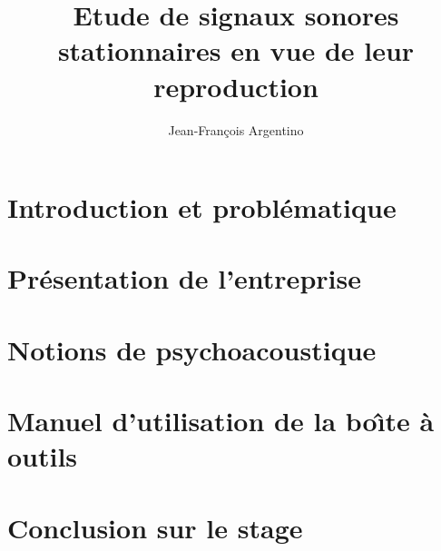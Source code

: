 \documentclass[12pt,a4paper,french]{report}
\title{Etude de signaux sonores stationnaires en vue de leur reproduction}
\author{Jean-Fran\c{c}ois Argentino}
\renewcommand \( { \left( }
\renewcommand \) { \right) }
\renewcommand \[ { \left[ }
\renewcommand \] { \right] }
\begin{document}
\sloppy

\maketitle
\newpage

\tableofcontents
\newpage

\listoffigures
\newpage

\chapter*{Introduction et probl{\'e}matique}


\chapter{Pr{\'e}sentation de l'entreprise}
\label{genesis}


\chapter{Notions de psychoacoustique}
\label{theorie}


\chapter{Manuel d'utilisation de la bo{\^\i}te {\`a} outils}
\label{manuel}


\chapter*{Conclusion sur le stage}

\end{document}
